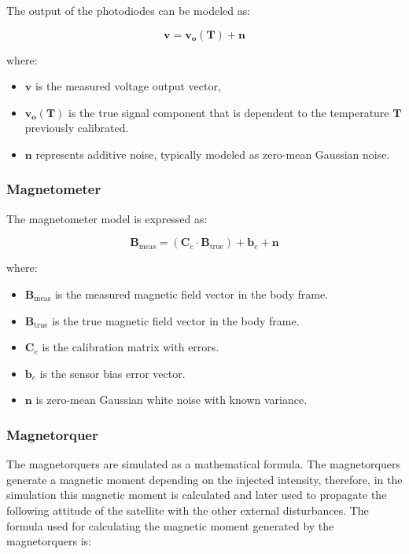The output of the photodiodes can be modeled as:

\begin{equation}
    \boldsymbol{v} = \boldsymbol{v_o(T)} + \boldsymbol{n}
\end{equation}

where:
\begin{itemize}
    \item $\boldsymbol{v}$ is the measured voltage output vector,
    \item $\boldsymbol{v_o(T)}$ is the true signal component that is dependent to the temperature $\boldsymbol{T}$ previously calibrated.
    \item $\boldsymbol{n}$ represents additive noise, typically modeled as zero-mean Gaussian noise.
\end{itemize}

\subsubsection{Magnetometer}

The magnetometer model is expressed as:

\begin{equation}
\boldsymbol{B}_{\text{meas}} = \left( \mathbf{C}_e \cdot \boldsymbol{B}_{\text{true}} \right) + \boldsymbol{b}_e + \boldsymbol{n}
\end{equation}

where:

\begin{itemize}
    \item $\boldsymbol{B}_{\text{meas}}$ is the measured magnetic field vector in the body frame.
    \item $\boldsymbol{B}_{\text{true}}$ is the true magnetic field vector in the body frame.
    \item $\mathbf{C}_e$ is the calibration matrix with errors.
    \item $\boldsymbol{b}_e$ is the sensor bias error vector.
    \item $\boldsymbol{n}$ is zero-mean Gaussian white noise with known variance.
\end{itemize}

\subsubsection{Magnetorquer}
The magnetorquers are simulated as a mathematical formula. The magnetorquers generate a magnetic moment depending on the injected intensity, therefore,
in the simulation this magnetic moment is calculated and later used to propagate the following attitude of the satellite with the other external disturbances.
The formula used for calculating the magnetic moment generated by the magnetorquers is:

